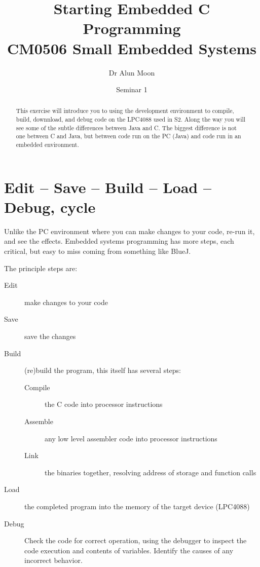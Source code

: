 \documentclass[a4paper]{tufte-handout}
\title{Starting Embedded C Programming\\\small{CM0506 Small Embedded Systems}}
\author{Dr Alun Moon}
\date{Seminar 1}
\begin{document}
\maketitle
\setlength{\parskip}{0.5em}
\setlength{\parindent}{0pt}

\newcommand\dangersign[1][2ex]{%
  \renewcommand\stacktype{L}%
  \scaleto{\stackon[1.3pt]{\color{red}$\triangle$}{\tiny!}}{#1}%
}

\begin{abstract}
  This exercise will introduce you to using the development
  environment to compile, build, downnload, and debug code on the LPC4088
  used in S2.  Along the way you will see some of the subtle
  differences between Java and C.  The biggest difference is not one
  between C and Java, but between code run on the PC (Java) and code
  run in an embedded environment.
\end{abstract}
\section{Edit -- Save -- Build -- Load -- Debug, cycle}
Unlike the PC environment where you can make changes to your code,
re-run it, and see the effects.  Embedded systems programming has more
steps, each critical, but easy to miss coming from something like
BlueJ.

The principle steps are:
\begin{description}
\item[Edit] make changes to your code
\item[Save] save the changes
\item[Build] (re)build the program, this itself has several steps:
  \begin{description}
  \item[Compile] the C code into processor instructions
  \item[Assemble] any low level assembler code into processor
    instructions
  \item[Link] the binaries together, resolving address of storage and
    function calls
  \end{description}
\item[Load] the completed program into the memory of the target device
  (LPC4088)
\item[Debug] Check the code for correct operation, using the debugger
  to inspect the code execution and contents of variables.  Identify
  the causes of any incorrect behavior.
\end{description}
\end{document}
